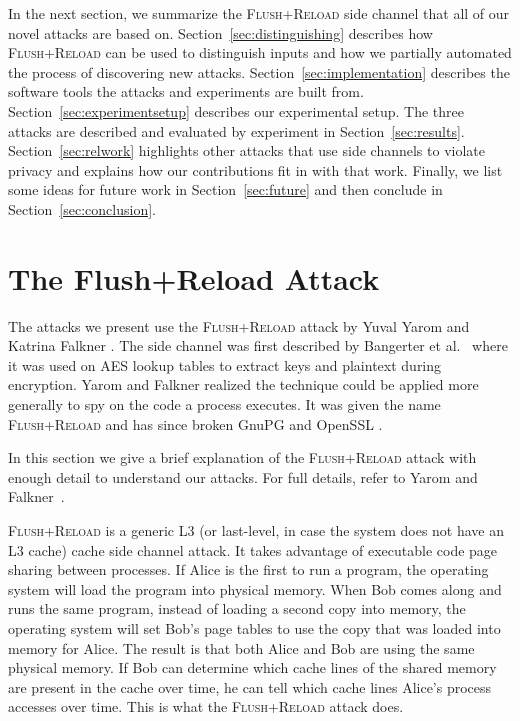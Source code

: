 \documentclass[letterpaper,twocolumn,10pt]{article}
\begin{document}
In the next section, we summarize the \textsc{Flush+Reload} side channel that
all of our novel attacks are based on. Section~\ref{sec:distinguishing}
describes how \textsc{Flush+Reload} can be used to distinguish inputs and how we
partially automated the process of discovering new attacks.
Section~\ref{sec:implementation} describes the software tools the attacks and
experiments are built from. Section~\ref{sec:experimentsetup} describes our
experimental setup. The three attacks are described and evaluated by experiment
in Section~\ref{sec:results}. Section~\ref{sec:relwork} highlights other attacks
that use side channels to violate privacy and explains how our contributions fit
in with that work. Finally, we list some ideas for future work in
Section~\ref{sec:future} and then conclude in Section~\ref{sec:conclusion}.

\section{The Flush+Reload Attack}
\label{sec:flushreload}

The attacks we present use the \textsc{Flush+Reload} attack by Yuval Yarom and
Katrina Falkner \cite{yarom2013flush}. The side channel was first described by
Bangerter et al.\ \cite{gullasch2011cache} where it was used on AES lookup
tables to extract keys and plaintext during encryption. Yarom and
Falkner realized the technique could be applied more generally to spy on the
code a process executes. It was given the name \textsc{Flush+Reload} and has
since broken GnuPG \cite{yarom2013flush} and OpenSSL \cite{benger2014ooh,
yarom2014recovering}.

In this section we give a brief explanation of the \textsc{Flush+Reload} attack
with enough detail to understand our attacks. For full details, refer to
Yarom and Falkner~\cite{yarom2013flush}.

\textsc{Flush+Reload} is a generic L3 (or last-level, in case the system does
not have an L3 cache) cache side channel attack. It takes advantage of
executable code page sharing between processes. If Alice is the first to run
a program, the operating system will load the program into physical memory. When
Bob comes along and runs the same program, instead of loading a second copy into
memory, the operating system will set Bob's page tables to use the copy that was
loaded into memory for Alice. The result is that both Alice and Bob are
using the same physical memory. If Bob can determine which cache lines of the
shared memory are present in the cache over time, he can tell which cache lines
Alice's process accesses over time. This is what the \textsc{Flush+Reload}
attack does.
\end{document}
